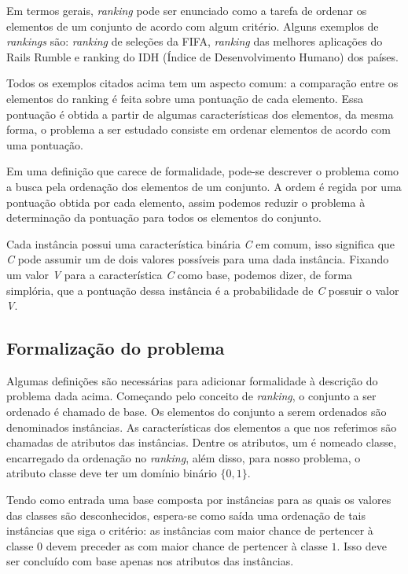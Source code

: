Em termos gerais, \emph{ranking} pode ser enunciado como a tarefa de
ordenar os elementos de um conjunto de acordo com algum critério. Alguns
exemplos de \emph{rankings} são: \emph{ranking} de seleções da FIFA,
\emph{ranking} das melhores aplicações do Rails Rumble e ranking do IDH
(Índice de Desenvolvimento Humano) dos países.

Todos os exemplos citados acima tem um aspecto comum: a comparação entre os
elementos do ranking é feita sobre uma pontuação de cada elemento. Essa
pontuação é obtida a partir de algumas características dos elementos, da mesma
forma, o problema a ser estudado consiste em ordenar elementos de acordo com
uma pontuação.

Em uma definição que carece de formalidade, pode-se descrever o problema como
a busca pela ordenação dos elementos de um conjunto. A ordem é regida por uma
pontuação obtida por cada elemento, assim podemos reduzir o problema à
determinação da pontuação para todos os elementos do conjunto.

Cada instância possui uma característica binária \emph{C} em comum, isso
significa que \emph{C} pode assumir um de dois valores possíveis para uma dada
instância. Fixando um valor \emph{V} para a característica \emph{C} como base,
podemos dizer, de forma simplória, que a pontuação dessa instância é a
probabilidade de \emph{C} possuir o valor \emph{V}.

\subsection{Formalização do problema}
Algumas definições são necessárias para adicionar formalidade à descrição do
problema dada acima. Começando pelo conceito de \emph{ranking}, o conjunto a
ser ordenado é chamado de base. Os elementos do conjunto a serem ordenados são
denominados instâncias. As características dos elementos a que nos referimos
são chamadas de atributos das instâncias. Dentre os atributos, um é nomeado
classe, encarregado da ordenação no \emph{ranking}, além disso, para nosso
problema, o atributo classe deve ter um domínio binário $\{0, 1\}$.

Tendo como entrada uma base composta por instâncias para as quais os valores
das classes são desconhecidos, espera-se como saída uma ordenação de tais
instâncias que siga o critério: as instâncias com maior chance de pertencer à
classe $0$ devem preceder as com maior chance de pertencer à classe $1$. Isso
deve ser concluído com base apenas nos atributos das instâncias.

